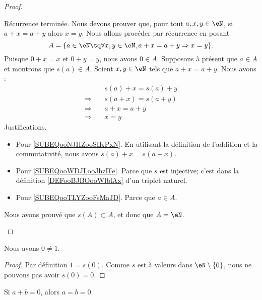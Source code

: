 \begin{proof}
\begin{subproof}
\begin{subequations}
		\end{subequations}
		Récurrence terminée.
		\spitem[Régularité]
		Nous devons prouver que, pour tout \( a,x,y\in \eN\), si \( a+x=a+y\) alors \( x=y\). Nous allons procéder par récurrence en posant
		\begin{equation}
			A=\{ a\in \eN\tq\forall x,y\in \eN, a+x=a+y\Rightarrow x=y\}.
		\end{equation}
		Puisque \( 0+x=x\) et \( 0+y=y\), nous avons \( 0\in A\). Supposons à présent que \( a\in A\) et montrons que \( s(a)\in A\). Soient \( x,y\in \eN\) tels que \( a+x=a+y\). Nous avons :
		\begin{subequations}
			\begin{align}
				            & \quad s(a)+x=s(a)+y                                \\
				\Rightarrow & \quad s(a+x)=s(a+y)    \label{SUBEQooNJHZooSIKPxN} \\
				\Rightarrow & \quad a+x=a+y          \label{SUBEQooWDJLooJhzIFe} \\
				\Rightarrow & \quad x=y              \label{SUBEQooTLYZooFsMaJD}
			\end{align}
		\end{subequations}
		Justifications.
		\begin{itemize}
			\item Pour \eqref{SUBEQooNJHZooSIKPxN}. En utilisant la définition de l'addition et la commutativité, nous avons \( s(a)+x=s(a+x)\).
			\item Pour \eqref{SUBEQooWDJLooJhzIFe}. Parce que \( s\) est injective; c'est dans la définition \ref{DEFooBJBOooWlblAx} d'un triplet naturel.
			\item Pour \eqref{SUBEQooTLYZooFsMaJD}. Parce que \( a\in A\).
		\end{itemize}
		Nous avons prouvé que \( s(A)\subset A\), et donc que \( A=\eN\).
	\end{subproof}
\end{proof}

\begin{lemma}       \label{LEMooCOMSooEWrumL}
	Nous avons \( 0\neq 1\).
\end{lemma}

\begin{proof}
	Par définition \( 1=s(0)\). Comme \( s\) est à valeurs dans \( \eN\setminus\{ 0 \}\), nous ne pouvons pas avoir \( s(0)=0\).
\end{proof}

\begin{lemma}       \label{LEMooQBHFooCuCusQ}
	Si \( a+b=0\), alors \( a=b=0\).
\end{lemma}

